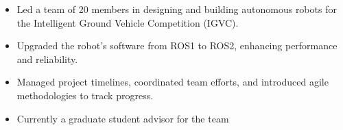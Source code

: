 \documentclass[10pt,letterpaper,ragged2e]{altacv}
\begin{document}
\divider

\begin{itemize}
	\item Led a team of 20 members in designing and building autonomous robots for the Intelligent Ground Vehicle Competition (IGVC).
	\item Upgraded the robot's software from ROS1 to ROS2, enhancing performance and reliability.
	\item Managed project timelines, coordinated team efforts, and introduced agile methodologies to track progress.
	\item Currently a graduate student advisor for the team
\end{itemize}

\clearpage
\end{document}
